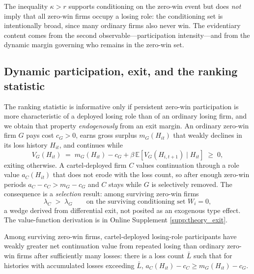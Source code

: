 The inequality $\kappa>r$ supports conditioning on the zero-win event but
does \emph{not} imply that all zero-win firms occupy a losing role: the
conditioning set is intentionally broad, since many ordinary firms also
never win. The evidentiary content comes from the second
observable---participation intensity---and from the dynamic margin
governing who remains in the zero-win set.

\subsection{Dynamic participation, exit, and the ranking statistic}
\label{app:framework_exit}

The ranking statistic is informative only if persistent zero-win
participation is more characteristic of a deployed losing role than of an
ordinary losing firm, and we obtain that property \emph{endogenously}
from an exit margin. An ordinary zero-win firm $G$ pays cost $c_G>0$,
earns gross surplus $m_G(H_{it})$ that weakly declines in its loss
history $H_{it}$, and continues while
\begin{equation}
\label{eq:exit_G}
  V_G(H_{it}) \;=\; m_G(H_{it}) - c_G + \beta\,
  \mathbb{E}\!\left[V_G(H_{i,t+1})\mid H_{it}\right] \;\ge\; 0,
\end{equation}
exiting otherwise. A cartel-deployed firm $C$ values continuation through
a role value $a_C(H_{it})$ that does not erode with the loss count, so
after enough zero-win periods $a_C-c_C>m_G-c_G$ and $C$ stays while $G$
is selectively removed. The consequence is a \emph{selection} result:
among surviving zero-win firms
\begin{equation}
\label{eq:lambda_rank}
  \lambda_C \;>\; \lambda_G \qquad
  \text{on the surviving conditioning set } W_i=0 ,
\end{equation}
a wedge derived from differential exit, not posited as an exogenous type
effect. The value-function derivation is in Online Supplement
\ref{supp:theory_exit}.

\begin{assumption}
\label{assu:submission_persistence}
Among surviving zero-win firms, cartel-deployed losing-role participants
have weakly greater net continuation value from repeated losing than
ordinary zero-win firms after sufficiently many losses: there is a loss
count $\bar L$ such that for histories with accumulated losses exceeding
$\bar L$, $a_C(H_{it})-c_C \ge m_G(H_{it})-c_G$.
\end{assumption}

